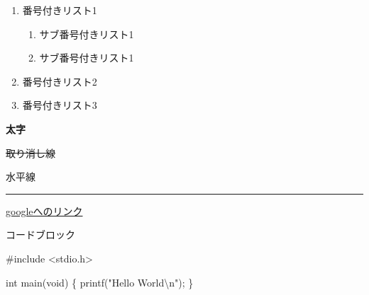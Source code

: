 \documentclass[
]{ltjarticle}
\newenvironment{Shaded}{}{}
\newcommand{\DataTypeTok}[1]{\textcolor[rgb]{0.56,0.13,0.00}{#1}}
\newcommand{\ImportTok}[1]{#1}
\newcommand{\NormalTok}[1]{#1}
\newcommand{\PreprocessorTok}[1]{\textcolor[rgb]{0.74,0.48,0.00}{#1}}
\newcommand{\SpecialCharTok}[1]{\textcolor[rgb]{0.25,0.44,0.63}{#1}}
\newcommand{\StringTok}[1]{\textcolor[rgb]{0.25,0.44,0.63}{#1}}
\providecommand{\tightlist}{%
  \setlength{\itemsep}{0pt}\setlength{\parskip}{0pt}}
\begin{document}
\begin{enumerate}
\def\labelenumi{\arabic{enumi}.}
\tightlist
\item
  番号付きリスト1

  \begin{enumerate}
  \def\labelenumii{\arabic{enumii}.}
  \tightlist
  \item
    サブ番号付きリスト1
  \item
    サブ番号付きリスト1
  \end{enumerate}
\item
  番号付きリスト2
\item
  番号付きリスト3
\end{enumerate}

\textbf{太字}

\sout{取り消し線}

水平線

\begin{center}\rule{0.5\linewidth}{\linethickness}\end{center}

\href{https://google.com}{googleへのリンク}

コードブロック

\begin{Shaded}
\begin{Highlighting}[]
\PreprocessorTok{#include }\ImportTok{<stdio.h>}

\DataTypeTok{int}\NormalTok{ main(}\DataTypeTok{void}\NormalTok{) \{}
\NormalTok{    printf(}\StringTok{"Hello World}\SpecialCharTok{\textbackslash{}n}\StringTok{"}\NormalTok{);}
\NormalTok{\}}
\end{Highlighting}
\end{Shaded}
\end{document}

